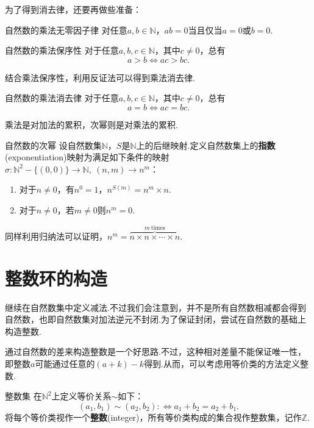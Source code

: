 \documentclass[lang=cn, zihao=5]{elegantbook}
\begin{document}
为了得到消去律，还要再做些准备：

\begin{proposition}{自然数的乘法无零因子律}
	对任意$a,b \in \mathbb{N}$，$ab=0$当且仅当$a=0$或$b=0$.
\end{proposition}

\begin{proposition}{自然数的乘法保序性}
	对于任意$a,b,c \in \mathbb{N}$，其中$c \neq 0$，总有$$a>b \Leftrightarrow ac>bc.$$
\end{proposition}

结合乘法保序性，利用反证法可以得到乘法消去律.

\begin{corollary}{自然数的乘法消去律}
	对于任意$a,b,c \in \mathbb{N}$，其中$c \neq 0$，总有$$a=b \Leftrightarrow ac=bc.$$
\end{corollary}

乘法是对加法的累积，次幂则是对乘法的累积.

\begin{definition}{自然数的次幂}
	设自然数集$\mathbb{N}$，$S$是$\mathbb{N}$上的后继映射.定义自然数集上的\textbf{指数}(exponentiation)映射为满足如下条件的映射$\sigma :\mathbb{N}^2-\{ (0,0) \} \to \mathbb{N},~(n,m) \to n^m$：
	\begin{enumerate}
		\item 对于$n \neq 0$，有$n^0=1$，$n^{S(m)}=n^m \times n$.
		\item 对于$n \neq 0$，若$m \neq 0$则$n^m=0$.
	\end{enumerate}
\end{definition}

同样利用归纳法可以证明，$n^m = \overbrace{n\times n\times \cdots \times n}^{m~ \text{times}}$.



\section{整数环的构造}

继续在自然数集中定义减法.不过我们会注意到，并不是所有自然数相减都会得到自然数，也即自然数集对加法逆元不封闭.为了保证封闭，尝试在自然数的基础上构造整数.

通过自然数的差来构造整数是一个好思路.不过，这种相对差量不能保证唯一性，即整数$a$可能通过任意的$(a+k)-k$得到.从而，可以考虑用等价类的方法定义整数.

\begin{definition}{整数集}
	在$\mathbb{N}^2$上定义等价关系$\sim$如下：$$(a_1,b_1) \sim (a_2,b_2) :\Leftrightarrow a_1+b_2=a_2+b_1.$$
	将每个等价类视作一个\textbf{整数}(integer)，所有等价类构成的集合视作整数集，记作$\mathbb{Z}$.
\end{definition}
\end{document}
